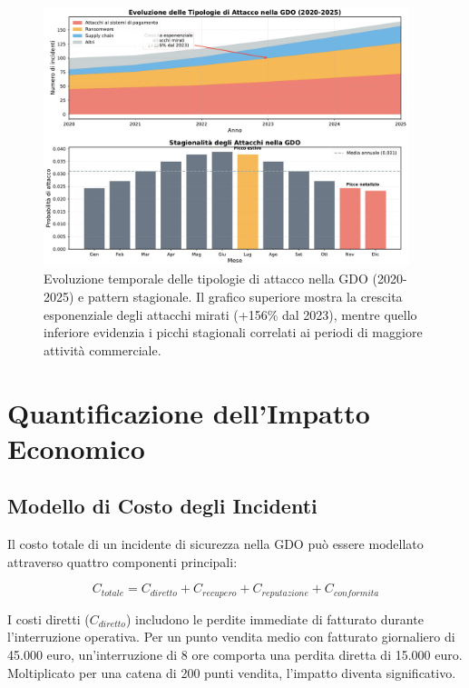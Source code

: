 \begin{figure}[htbp]
\centering
\includegraphics[width=0.95\textwidth]{thesis_figures/cap2/fig_2_3_evoluzione_attacchi.pdf}
\caption{Evoluzione temporale delle tipologie di attacco nella GDO (2020-2025) e pattern stagionale. Il grafico superiore mostra la crescita esponenziale degli attacchi mirati (+156\% dal 2023), mentre quello inferiore evidenzia i picchi stagionali correlati ai periodi di maggiore attività commerciale.}
\label{fig:evoluzione_attacchi}
\end{figure}

\section{\texorpdfstring{Quantificazione dell'Impatto Economico}{2.4 - Quantificazione dell'Impatto Economico}}
\label{sec:cap2_impatto}

\subsection{\texorpdfstring{Modello di Costo degli Incidenti}{2.4.1 - Modello di Costo degli Incidenti}}
\label{subsec:modello_costo}

Il costo totale di un incidente di sicurezza nella GDO può essere modellato attraverso quattro componenti principali:

\begin{equation}
\label{eq:costo_totale}
C_{totale} = C_{diretto} + C_{recupero} + C_{reputazione} + C_{conformita}
\end{equation}

I costi diretti ($C_{diretto}$) includono le perdite immediate di fatturato durante l'interruzione operativa. Per un punto vendita medio con fatturato giornaliero di 45.000 euro, un'interruzione di 8 ore comporta una perdita diretta di 15.000 euro. Moltiplicato per una catena di 200 punti vendita, l'impatto diventa significativo.

